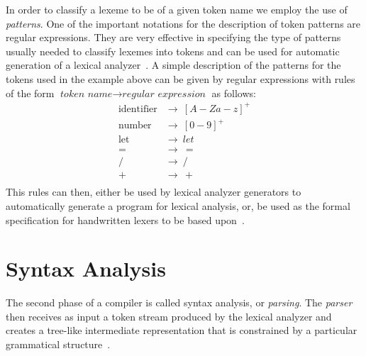 \documentclass[
    oneside,
    english,
    coorientadorbanca,
    embeddedlogo,
    noabntexcite
]{ufsc-thesis-rn46-2019}
\begin{document}
In order to classify a lexeme to be of a given token name we employ the use of \textit{patterns}.
One of the important notations for the description of token patterns are regular expressions.
They are very effective in specifying the type of patterns usually needed to classify lexemes into tokens and can be used for automatic generation of a lexical analyzer~\cite{Aho:2006:CPT:1177220}.
A simple description of the patterns for the tokens used in the example above can be given by regular expressions with rules of the form $\textit{token name} \rightarrow \textit{regular expression}$ as follows:
\begin{equation*}
    \begin{aligned}
        \textrm{identifier} & \rightarrow \ {[A-Za-z]}^+ \\
        \textrm{number}     & \rightarrow \ {[0-9]}^+    \\
        \textrm{let}        & \rightarrow \ let          \\
        =                   & \rightarrow \  =           \\
        /                   & \rightarrow \ /            \\
        +                   & \rightarrow \ +            \\
    \end{aligned}
\end{equation*}
This rules can then, either be used by lexical analyzer generators to automatically generate a program for lexical analysis, or, be used as the formal specification for handwritten lexers to be based upon~\cite{Aho:2006:CPT:1177220}.

\section{Syntax Analysis}\label{chapter:background:sec:syntax}

The second phase of a compiler is called syntax analysis, or \textit{parsing}.
The \textit{parser} then receives as input a token stream produced by the lexical analyzer and creates a tree-like intermediate representation that is constrained by a particular grammatical structure~\cite{Aho:2006:CPT:1177220}.
\end{document}
